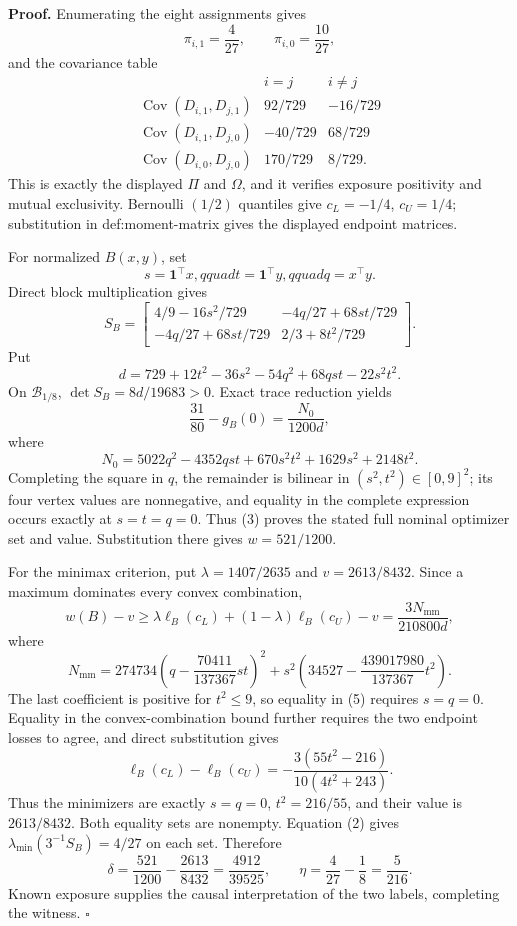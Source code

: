 \textbf{Proof.}
Enumerating the eight assignments gives
\[
\pi_{i,1}=\frac4{27},\qquad \pi_{i,0}=\frac{10}{27},
\]
and the covariance table
\[
\begin{array}{c|cc}
&i=j&i\ne j\\ \hline
\operatorname{Cov}(D_{i,1},D_{j,1})&92/729&-16/729\\
\operatorname{Cov}(D_{i,1},D_{j,0})&-40/729&68/729\\
\operatorname{Cov}(D_{i,0},D_{j,0})&170/729&8/729.
\end{array}
\tag{1}
\]
This is exactly the displayed \(\Pi\) and \(\Omega\), and it verifies exposure positivity and mutual exclusivity.  Bernoulli \((1/2)\) quantiles give \(c_L=-1/4\), \(c_U=1/4\); substitution in def:moment-matrix gives the displayed endpoint matrices.

For normalized \(B(x,y)\), set
\[
s=\mathbf1^{\top}x,qquad t=\mathbf1^{\top}y,qquad q=x^{\top}y.
\]
Direct block multiplication gives
\[
S_B=
\begin{bmatrix}
4/9-16s^2/729&-4q/27+68st/729\\
-4q/27+68st/729&2/3+8t^2/729
\end{bmatrix}.
\tag{2}
\]
Put
\[
d=729+12t^2-36s^2-54q^2+68qst-22s^2t^2.
\]
On \(\mathcal B_{1/8}\), \(\det S_B=8d/19683>0\).  Exact trace reduction yields
\[
\frac{31}{80}-g_B(0)=\frac{N_0}{1200d},
\tag{3}
\]
where
\[
N_0=5022q^2-4352qst+670s^2t^2+1629s^2+2148t^2.
\]
Completing the square in \(q\), the remainder is bilinear in \((s^2,t^2)\in[0,9]^2\); its four vertex values are nonnegative, and equality in the complete expression occurs exactly at \(s=t=q=0\).  Thus (3) proves the stated full nominal optimizer set and value.  Substitution there gives \(w=521/1200\).

For the minimax criterion, put \(\lambda=1407/2635\) and \(v=2613/8432\).  Since a maximum dominates every convex combination,
\[
w(B)-v\ge\lambda\ell_B(c_L)+(1-\lambda)\ell_B(c_U)-v
=\frac{3N_{\mathrm{mm}}}{210800d},
\tag{4}
\]
where
\[
N_{\mathrm{mm}}
=274734\left(q-\frac{70411}{137367}st\right)^2
+s^2\left(34527-\frac{439017980}{137367}t^2\right).
\tag{5}
\]
The last coefficient is positive for \(t^2\le9\), so equality in (5) requires \(s=q=0\).  Equality in the convex-combination bound further requires the two endpoint losses to agree, and direct substitution gives
\[
\ell_B(c_L)-\ell_B(c_U)
=-\frac{3(55t^2-216)}{10(4t^2+243)}.
\]
Thus the minimizers are exactly \(s=q=0\), \(t^2=216/55\), and their value is \(2613/8432\).  Both equality sets are nonempty.  Equation (2) gives \(\lambda_{\min}(3^{-1}S_B)=4/27\) on each set.  Therefore
\[
\delta=\frac{521}{1200}-\frac{2613}{8432}=\frac{4912}{39525},
\qquad
\eta=\frac4{27}-\frac18=\frac5{216}.
\]
Known exposure supplies the causal interpretation of the two labels, completing the witness. \(\square\)